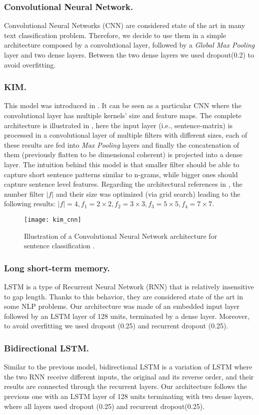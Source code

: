 \subsubsection{Convolutional Neural Network.}
Convolutional Neural Networks (CNN) are considered state of the art in many text classification problem. Therefore, we decide to use them in a simple architecture composed by a convolutional layer, followed by a \emph{Global Max Pooling} layer and two dense layers.
Between the two dense layers we used dropout(0.2) to avoid overfitting.

\subsubsection{KIM.}
This model was introduced in \cite{kim2014convolutional}. It can be seen as a particular CNN where the convolutional layer has multiple kernels' size and feature maps.
The complete architecture is illustrated in , here the input layer (i.e., sentence-matrix) is processed in a convolutional layer of multiple filters with different sizes, each of these results are fed into \emph{Max Pooling} layers and finally the concatenation of them (previously flatten to be dimensional coherent) is projected into a dense layer.
The intuition behind this model is that smaller filter should be able to capture short sentence patterns similar to n-grams, while bigger ones should capture sentence level features.
Regarding the architectural references in \cite{kim2014convolutional}, the number filter $|f|$ and their size was optimized (via grid search) leading to the following results: $|f| = 4, f_1 = 2\times2, f_2 = 3\times3, f_3 = 5\times5, f_4 = 7\times7$.

\begin{figure}[h]
\footnotesize
\centering
\texttt{[image: kim\_cnn]}
\caption{Illustration of a Convolutional Neural Network architecture for sentence classification \cite{zhang2015sensitivity}.}
\label{fig:kim}
\end{figure}

\subsubsection{Long short-term memory.}
LSTM is a type of Recurrent Neural Network (RNN) that is relatively insensitive to gap length. Thanks to this behavior, they are considered state of the art in some NLP problems.
Our architecture was made of an embedded input layer followed by an LSTM layer of 128 units, terminated by a dense layer. Moreover, to avoid overfitting we used dropout (0.25) and recurrent dropout (0.25).

\subsubsection{Bidirectional LSTM.} Similar to the previous model, bidirectional LSTM is a variation of LSTM where the two RNN receive different inputs, the original and its reverse order, and their results are connected through the recurrent layers.
Our architecture follows the previous one with an LSTM layer of 128 units terminating with two dense layers, where all layers used dropout (0.25) and recurrent dropout(0.25).

